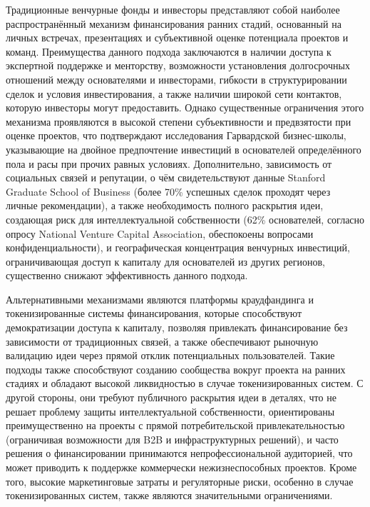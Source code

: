 \documentclass[
    candidate, %
    subf, %
    dotsinheaders=false,
]{disser}
\begin{document}
Традиционные венчурные фонды и инвесторы представляют собой наиболее распространённый механизм финансирования ранних стадий, основанный на личных встречах, презентациях и субъективной оценке потенциала проектов и команд. Преимущества данного подхода заключаются в наличии доступа к экспертной поддержке и менторству, возможности установления долгосрочных отношений между основателями и инвесторами, гибкости в структурировании сделок и условия инвестирования, а также наличии широкой сети контактов, которую инвесторы могут предоставить. Однако существенные ограничения этого механизма проявляются в высокой степени субъективности и предвзятости при оценке проектов, что подтверждают исследования Гарвардской бизнес-школы, указывающие на двойное предпочтение инвестиций в основателей определённого пола и расы при прочих равных условиях. Дополнительно, зависимость от социальных связей и репутации, о чём свидетельствуют данные Stanford Graduate School of Business (более 70\% успешных сделок проходят через личные рекомендации), а также необходимость полного раскрытия идеи, создающая риск для интеллектуальной собственности (62\% основателей, согласно опросу National Venture Capital Association, обеспокоены вопросами конфиденциальности), и географическая концентрация венчурных инвестиций, ограничивающая доступ к капиталу для основателей из других регионов, существенно снижают эффективность данного подхода.

Альтернативными механизмами являются платформы краудфандинга и токенизированные системы финансирования, которые способствуют демократизации доступа к капиталу, позволяя привлекать финансирование без зависимости от традиционных связей, а также обеспечивают рыночную валидацию идеи через прямой отклик потенциальных пользователей. Такие подходы также способствуют созданию сообщества вокруг проекта на ранних стадиях и обладают высокой ликвидностью в случае токенизированных систем. С другой стороны, они требуют публичного раскрытия идеи в деталях, что не решает проблему защиты интеллектуальной собственности, ориентированы преимущественно на проекты с прямой потребительской привлекательностью (ограничивая возможности для B2B и инфраструктурных решений), и часто решения о финансировании принимаются непрофессиональной аудиторией, что может приводить к поддержке коммерчески нежизнеспособных проектов. Кроме того, высокие маркетинговые затраты и регуляторные риски, особенно в случае токенизированных систем, также являются значительными ограничениями.
\end{document}

